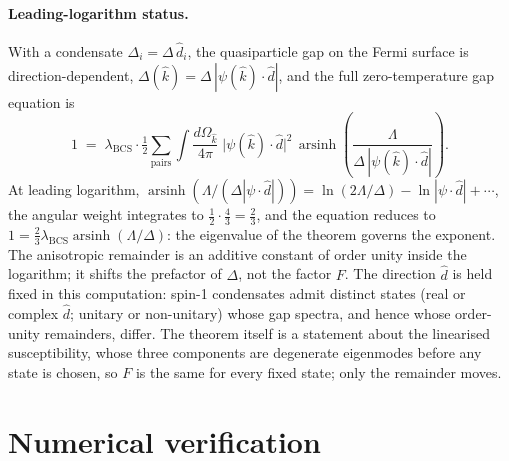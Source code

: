 \documentclass[11pt]{article}
\begin{document}
\paragraph{Leading-logarithm status.} With a condensate $\Delta_i = \Delta\, \hat d_i$, the quasiparticle gap on the Fermi surface is direction-dependent, $\Delta(\hat k) = \Delta\, |\psi(\hat k) \cdot \hat d|$, and the full zero-temperature gap equation is
\begin{equation}
1 \;=\; \lambda_{\mathrm{BCS}} \cdot \tfrac{1}{2} \sum_{\text{pairs}} \int \frac{d\Omega_{\hat k}}{4\pi}\; \big| \psi(\hat k) \cdot \hat d \big|^2 \, \operatorname{arsinh}\!\left( \frac{\Lambda}{\Delta\, |\psi(\hat k) \cdot \hat d|} \right).
\end{equation}
At leading logarithm, $\operatorname{arsinh}(\Lambda/(\Delta|\psi\cdot\hat d|)) = \ln(2\Lambda/\Delta) - \ln|\psi\cdot\hat d| + \cdots$, the angular weight integrates to $\tfrac{1}{2} \cdot \tfrac{4}{3} = \tfrac{2}{3}$, and the equation reduces to $1 = \tfrac{2}{3} \lambda_{\mathrm{BCS}} \operatorname{arsinh}(\Lambda/\Delta)$: the eigenvalue of the theorem governs the exponent. The anisotropic remainder is an additive constant of order unity inside the logarithm; it shifts the prefactor of $\Delta$, not the factor $F$. The direction $\hat d$ is held fixed in this computation: spin-1 condensates admit distinct states (real or complex $\hat d$; unitary or non-unitary) whose gap spectra, and hence whose order-unity remainders, differ. The theorem itself is a statement about the linearised susceptibility, whose three components are degenerate eigenmodes before any state is chosen, so $F$ is the same for every fixed state; only the remainder moves.

\section{Numerical verification}
\end{document}
